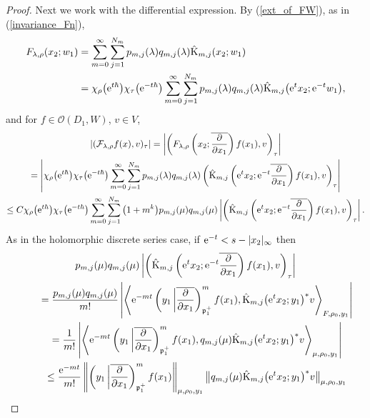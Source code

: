 \documentclass[pdftex]{sigma}
\numberwithin{equation}{section}
\newcommand{\fp}{\mathfrak{p}}
\newcommand{\cF}{\mathcal{F}}
\newcommand{\cO}{\mathcal{O}}
\newcommand{\rK}{\mathrm{K}}
\begin{document}
\begin{proof}
Next we work with the differential expression. By (\ref{ext_of_FW}), as in (\ref{invariance_Fn}),
\begin{align*}
F_{\lambda,\rho}(x_2;w_1)
&=\sum_{m=0}^\infty \sum_{j=1}^{N_m}p_{m,j}(\lambda)q_{m,j}(\lambda)\hat{\rK}_{m,j}(x_2;w_1) \\
&=\chi_\rho\big({\rm e}^{t\hbar}\big)\chi_\tau\big({\rm e}^{-t\hbar}\big)
\sum_{m=0}^\infty \sum_{j=1}^{N_m}p_{m,j}(\lambda)q_{m,j}(\lambda)\hat{\rK}_{m,j}\big({\rm e}^tx_2;{\rm e}^{-t}w_1\big),
\end{align*}
and for $f\in\cO(D_1,W)$, $v\in V$,
\begin{gather*}
 |(\cF_{\lambda,\rho}f(x),v)_\tau|=\left|\left(F_{\lambda,\rho}\left(x_2;\overline{\frac{\partial}{\partial x_1}}\right)f(x_1),v\right)_\tau\right| \\
 =\left|\chi_\rho\big({\rm e}^{t\hbar}\big)\chi_\tau\big({\rm e}^{-t\hbar}\big)\sum_{m=0}^\infty \sum_{j=1}^{N_m}p_{m,j}(\lambda)q_{m,j}(\lambda)
\left(\hat{\rK}_{m,j}\left({\rm e}^tx_2;{\rm e}^{-t}\overline{\frac{\partial}{\partial x_1}}\right)f(x_1),v\right)_\tau\right| \\
 \le C\chi_\rho\big({\rm e}^{t\hbar}\big)\chi_\tau\big({\rm e}^{-t\hbar}\big)\sum_{m=0}^\infty \sum_{j=1}^{N_m}\big(1+m^k\big)p_{m,j}(\mu)q_{m,j}(\mu)
\left|\left(\hat{\rK}_{m,j}\left({\rm e}^tx_2;{\rm e}^{-t}\overline{\frac{\partial}{\partial x_1}}\right)f(x_1),v\right)_\tau\right|.
\end{gather*}
As in the holomorphic discrete series case, if ${\rm e}^{-t}<s-|x_2|_\infty$ then
\begin{gather*}
 p_{m,j}(\mu)q_{m,j}(\mu)\left|\left(\hat{\rK}_{m,j}\left({\rm e}^tx_2;{\rm e}^{-t}\overline{\frac{\partial}{\partial x_1}}\right)f(x_1),
v\right)_\tau\right| \\
\qquad{}=\frac{p_{m,j}(\mu)q_{m,j}(\mu)}{m!}\left|\left\langle {\rm e}^{-mt}
\left(y_1\,\middle|\overline{\frac{\partial}{\partial x_1}}\right)_{\fp^+_1}^mf(x_1),
\hat{\rK}_{m,j}\big({\rm e}^tx_2;y_1\big)^*v\right\rangle_{F,\rho_0,y_1}\right| \\
\qquad{}=\frac{1}{m!}\left|\left\langle {\rm e}^{-mt}
\left(y_1\,\middle|\overline{\frac{\partial}{\partial x_1}}\right)_{\fp^+_1}^mf(x_1),
q_{m,j}(\mu)\hat{\rK}_{m,j}\big({\rm e}^tx_2;y_1\big)^*v\right\rangle_{\mu,\rho_0,y_1}\right| \\
\qquad{}\le \frac{{\rm e}^{-mt}}{m!}
\left\Vert\left(y_1\,\middle|\overline{\frac{\partial}{\partial x_1}}\right)_{\fp^+_1}^mf(x_1)\right\Vert_{\mu,\rho_0,y_1}
\big\Vert q_{m,j}(\mu)\hat{\rK}_{m,j}\big({\rm e}^tx_2;y_1\big)^*v\big\Vert_{\mu,\rho_0,y_1} \\

\end{gather*}
\end{proof}
\end{document}
